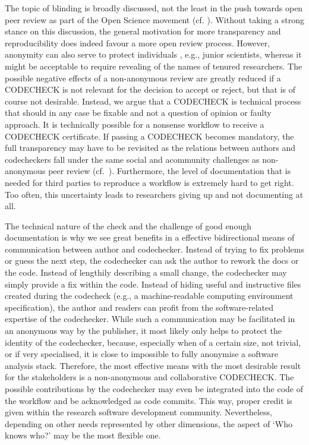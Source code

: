 \documentclass[12pt]{article}
\begin{document}
The topic of blinding is broadly discussed, not the least in the push towards
open peer review as part of the Open Science movement 
(cf. \cite{ross-hellauer_guidelines_2019}).
Without taking a strong stance on this discussion, the general motivation 
for more  transparency and reproducibility does indeed favour a more open 
review process.
However, anonymity can also serve to protect individuals 
\cite{tennant_limitations_2020}, e.g.,  junior scientists, whereas it might 
be acceptable to require revealing of the names of tenured researchers.
The possible negative effects of a non-anonymous review are greatly reduced
if a CODECHECK is not relevant for the decision to accept or reject, but that
is of course not desirable. Instead, we argue that a CODECHECK is technical
process that should in any case be fixable and not a question of opinion or
faulty approach. It is technically possible for a nonsense workflow to receive
a CODECHECK certificate.
If passing a CODECHECK becomes mandatory, the full transparency may have to be 
revisited as the relations between authors and codecheckers fall under the
same social and acommunity challenges as non-anonymous peer review
(cf.~\cite{everythinghertz123}).
Furthermore, the level of documentation that is needed for third parties
to reproduce a workflow is extremely hard to get right. Too often, this 
uncertainty leads to researchers giving up and not documenting at all.

The technical nature of the check and the challenge of good enough 
documentation is why we see great benefits in a effective bidirectional
means of communication between author and codechecker. Instead of trying to
fix problems or guess the next step, the codechecker can ask the author to 
rework the docs  or the code.
Instead of lengthily describing a small change, the codechecker may simply
provide a fix within the code.
Instead of hiding useful and  instructive files created during the codecheck
(e.g., a machine-readable computing environment specification), the author 
and readers can profit from the software-related expertise of the
codechecker.
While such a communication may be facilitated in an anonymous way by the 
publisher, it most likely only helps to protect the identity of the 
codechecker, because, especially when of a certain size, not trivial, or 
if very specialised, it is close to impossible to fully anonymise a 
software analysis stack.
Therefore, the most effective means with the most desirable result for
the stakeholders is a non-anonymous and collaborative CODECHECK.
The possible contributions by the codechecker may even be integrated into
the code of the workflow and be acknowledged as code commits. This way, 
proper credit is given within the research software development community.
Nevertheless, depending on other needs represented by other dimensions,
the aspect of `Who knows who?' may be the most flexible one.
\end{document}
